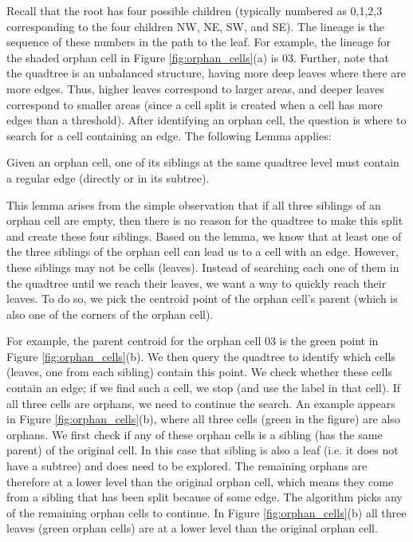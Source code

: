 Recall that the root has four possible children (typically numbered as 0,1,2,3 corresponding to the four children NW, NE, SW, and SE). The lineage is the 
sequence of these numbers in the path to the leaf. For example, the lineage for the shaded orphan cell in Figure \ref{fig:orphan_cells}(a) is 03. Further, note 
that the quadtree is an unbalanced structure, having more deep leaves where there are more edges. Thus, higher leaves correspond to larger areas, and deeper 
leaves correspond to smaller areas (since a cell split is created when a cell has more edges than a threshold). After identifying an orphan cell, the question 
is where to search for a cell containing an edge. The following Lemma applies:

\begin{lemma}\label{lem:cells}
Given an orphan cell, one of its siblings at the same quadtree level must contain a regular edge (directly or in its subtree). 
\end{lemma}

This lemma arises from the simple observation that if all three siblings of an orphan cell are empty, then there is no reason for the quadtree to make this 
split and create these four siblings. Based on the lemma, we know that at least one of the three siblings of the orphan cell can lead us to a cell with an 
edge. 
However, these siblings may not be cells (leaves). Instead of searching each one of them in the quadtree until we reach their leaves, we want a way to quickly 
reach their leaves. To do so, we pick the centroid point of the orphan cell's parent (which is also one of the corners of the orphan cell). 

For example, the parent centroid for the orphan cell 03 is the green point in Figure \ref{fig:orphan_cells}(b). We then query the quadtree to identify which 
cells (leaves, one from each sibling) contain this point. We check whether these cells contain an edge; if we find such a cell, we stop (and use the label in 
that cell). If all three cells are orphans, we need to continue the search. 
An example appears in Figure \ref{fig:orphan_cells}(b), where all three cells (green in the figure) are also orphans.
We first check if any of these orphan cells is a sibling (has the same parent) of the original cell. In this case that sibling is also a leaf (i.e. it does not 
have a subtree) and does need to be explored.
The remaining orphans are therefore at a lower level than the original orphan cell, which means they come from a sibling that has been split because of some 
edge. The algorithm picks any of the remaining orphan cells to continue. In Figure \ref{fig:orphan_cells}(b) all three leaves (green orphan cells) are at a 
lower level than the original orphan cell. 

